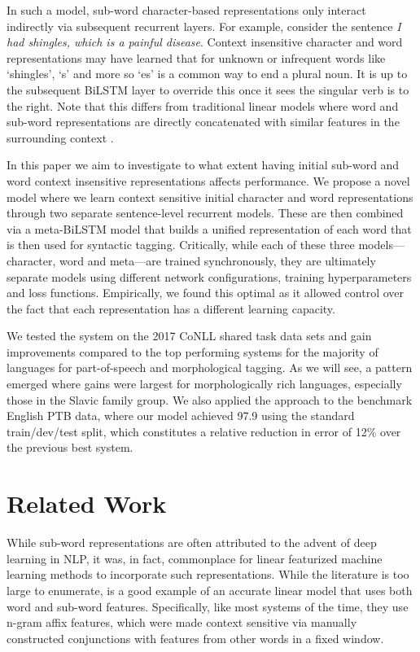 \documentclass[11pt,a4paper]{article}
\begin{document}
In such a model, sub-word character-based representations only interact indirectly via subsequent recurrent layers. For example, consider the sentence \emph{I had shingles, which is a painful disease}. 
Context insensitive character and word representations may have learned that for unknown or infrequent words like `shingles', `s' and more so `es' is a common way to end a plural noun. It is up to the subsequent BiLSTM layer to override this once it sees the singular verb is to the right. Note that this differs from traditional linear models where word and sub-word representations are directly concatenated with similar features in the surrounding context \cite{gimenez2004}.

In this paper we aim to investigate to what extent having initial sub-word and word context insensitive representations affects performance. We propose a novel model where we learn context sensitive initial character and word representations through two separate sentence-level recurrent models. These are then combined via a meta-BiLSTM model that builds a unified representation of each word that is then used for syntactic tagging. Critically, while each of these three models---character, word and meta---are trained synchronously, they are ultimately separate models using different network configurations, training hyperparameters and loss functions. Empirically, we found this optimal as it allowed control over the fact that each representation has a different learning capacity. 



We tested the system on the 2017 CoNLL shared task data sets and gain improvements compared to the top performing systems for the majority of languages for part-of-speech and morphological tagging. As we will see, a pattern emerged where gains were largest for morphologically rich languages, especially those in the Slavic family group.
We also applied the approach to the benchmark English PTB data, where our model achieved 97.9 using the standard train/dev/test split, which constitutes a relative reduction in error of 12\% over the previous best system. 


\section{Related Work}

While sub-word representations are often attributed to the advent of deep learning in NLP, it was, in fact, commonplace for linear featurized machine learning methods to incorporate such representations. While the literature is too large to enumerate, 
 is a good example of an accurate linear model that uses both word and sub-word features. Specifically, like most systems of the time, they use n-gram affix features, which were made context sensitive via manually constructed conjunctions with features from other words in a fixed window.
\end{document}
